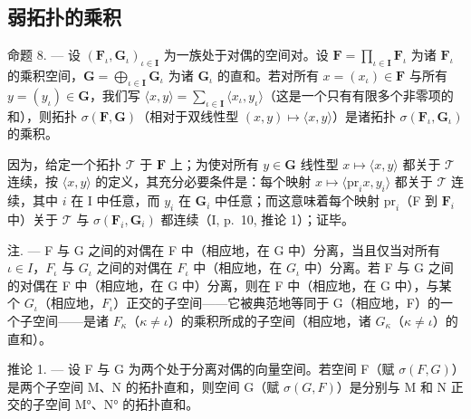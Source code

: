 \subsection{弱拓扑的乘积}

命题 8. --- 设 \((\mathbf{F}_{\iota}, \mathbf{G}_{\iota})_{\iota \in \mathbf{I}}\) 为一族处于对偶的空间对。设 \(\mathbf{F} = \prod_{\iota \in \mathbf{I}} \mathbf{F}_{\iota}\) 为诸 \(\mathbf{F}_{\iota}\) 的乘积空间，\(\mathbf{G} = \bigoplus_{\iota \in \mathbf{I}} \mathbf{G}_{\iota}\) 为诸 \(\mathbf{G}_{\iota}\) 的直和。若对所有 \(x = (x_{\iota}) \in \mathbf{F}\) 与所有 \(y = (y_{\iota}) \in \mathbf{G}\)，我们写 \(\langle x, y \rangle = \sum_{\iota \in \mathbf{I}} \langle x_{\iota}, y_{\iota} \rangle\)（这是一个只有有限多个非零项的和），则拓扑 \(\sigma(\mathbf{F}, \mathbf{G})\)（相对于双线性型 \((x, y) \mapsto \langle x, y \rangle\)）是诸拓扑 \(\sigma(\mathbf{F}_{\iota}, \mathbf{G}_{\iota})\) 的乘积。

因为，给定一个拓扑 \(\mathcal{T}\) 于 \(\mathbf{F}\) 上；为使对所有 \(y \in \mathbf{G}\) 线性型 \(x \mapsto \langle x, y \rangle\) 都关于 \(\mathcal{T}\) 连续，按 \(\langle x, y \rangle\) 的定义，其充分必要条件是：每个映射 \(x \mapsto \langle \mathrm{pr}_i x, y_i \rangle\) 都关于 \(\mathcal{T}\) 连续，其中 \(i\) 在 I 中任意，而 \(y_i\) 在 \(\mathbf{G}_i\) 中任意；而这意味着每个映射 \(\mathrm{pr}_i\)（F 到 \(\mathbf{F}_i\) 中）关于 \(\mathcal{T}\) 与 \(\sigma(\mathbf{F}_i, \mathbf{G}_i)\) 都连续（I, p.~10, 推论 1）；证毕。

注. --- F 与 G 之间的对偶在 F 中（相应地，在 G 中）分离，当且仅当对所有 \(\iota\in I\)，\(F_{\iota}\) 与 \(G_{\iota}\) 之间的对偶在 \(F_{\iota}\) 中（相应地，在 \(G_{\iota}\) 中）分离。若 F 与 G 之间的对偶在 F 中（相应地，在 G 中）分离，则在 F 中（相应地，在 G 中），与某个 \(G_{\iota}\)（相应地，\(F_{\iota}\)）正交的子空间——它被典范地等同于 G（相应地，F）的一个子空间——是诸 \(F_{\kappa}\)（\(\kappa\neq\iota\)）的乘积所成的子空间（相应地，诸 \(G_{\kappa}\)（\(\kappa\neq\iota\)）的直和）。

推论 1. --- 设 F 与 G 为两个处于分离对偶的向量空间。若空间 F（赋 \(\sigma(F, G)\)）是两个子空间 M、N 的拓扑直和，则空间 G（赋 \(\sigma(G, F)\)）是分别与 M 和 N 正交的子空间 M°、N° 的拓扑直和。

